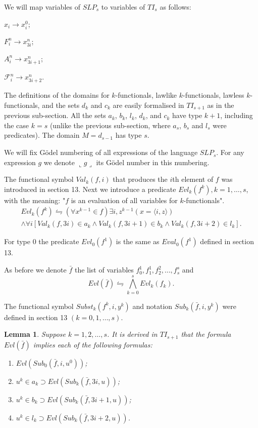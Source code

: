 \documentclass{asl}
\newtheorem{lemma}{Lemma}[section]
\theoremstyle{definition}
\begin{document}
We will map variables of $SLP_s$ to variables of $TI_s$ as follows:
\begin{list}{â¢}{â¢}
\item $x_i \rightarrow x_i^0$;
\medskip
\item $F_i^n \rightarrow x_{3i}^n$;
\medskip
\item $A_i^n \rightarrow x_{3i+1}^n$;
\medskip
\item $\mathcal{F}_i^n \rightarrow x_{3i+2}^n$.
\end{list}

The definitions of the domains for $k$-functionals, lawlike $k$-functionals, lawless $k$-functionals, and the sets $d_k$ and $c_k$ are easily formalised in $TI_{s+1}$ as in the previous sub-section. All the sets $a_k$, $b_k$, $l_k$, $d_k$, and $c_k$ have type $k+1$, including the case $k=s$ (unlike the previous sub-section, where $a_s$, $b_s$ and $l_s$ were predicates). The domain $M=d_{s-1}$ has type $s$.

We will fix G\"{o}del numbering of all expressions of the language $SLP_s$. For any expression $g$ we denote $\llcorner g\lrcorner$ its G\"{o}del number in this numbering.

The functional symbol $Val_k(f,i)$ that produces the $i$th element of $f$ was introduced in section 13.  Next we introduce a predicate $Evl_k(f^k), k=1,\ldots,s$, with the meaning: "$f$ is an evaluation of all variables for $k$-functionals".
\begin{multline*}
Evl_k(f^k)\leftrightharpoons \left(\forall x^{k-1}\in f \right)\exists i, z^{k-1}(x=\langle i,z\rangle)
\\
\wedge \forall i\left[ Val_k(f,3i)\in a_k \wedge Val_k(f,3i+1)\in b_k \wedge Val_k(f,3i+2)\in l_k \right]. 
\end{multline*}

For type 0 the predicate $Evl_0(f^1)$ is the same as $Eval_0(f^1)$ defined in section 13.

As before we denote $\bar{f}$ the list of variables $f_0^1,f_1^1,f_2^2,\ldots,f_s^s$ and 
\[Evl(\bar{f})\leftrightharpoons \bigwedge_{k=0}^s Evl_k(f_k).\] 

The functional symbol $Subst_k(f^k,i,y^k)$ and notation $Sub_k(\bar{f},i,y^k)$ were defined in section 13 $(k=0,1,\ldots,s)$.

\begin{lemma}
Suppose $k=1,2,\ldots,s$. It is derived in $TI_{s+1}$ that the formula $Evl(\bar{f})$ implies each of the following formulas:
\begin{enumerate}
\item $Evl(Sub_0(\bar{f},i,u^0))$;
\smallskip
\item $u^k\in a_k \supset Evl(Sub_k(\bar{f},3i,u))$;
\smallskip
\item $u^k\in b_k \supset Evl(Sub_k(\bar{f},3i+1,u))$;
\smallskip
\item $u^k\in l_k \supset Evl(Sub_k(\bar{f},3i+2,u))$.
\end{enumerate}
\label{lemma:force0}
\end{lemma}
\end{document}
